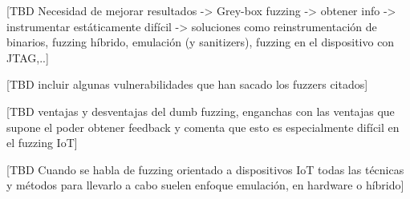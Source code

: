 [TBD Necesidad de mejorar resultados -> Grey-box fuzzing -> obtener info -> instrumentar estáticamente difícil -> soluciones como 
reinstrumentación de binarios, fuzzing híbrido, emulación (y sanitizers), fuzzing en el dispositivo con JTAG,..]

[TBD incluir algunas vulnerabilidades que han sacado los fuzzers citados]

[TBD ventajas y 
desventajas del dumb fuzzing, enganchas con las ventajas que supone el poder obtener feedback 
y comenta que esto es especialmente difícil en el fuzzing IoT]

[TBD Cuando se habla de fuzzing orientado a dispositivos IoT todas las técnicas y métodos para llevarlo 
a cabo suelen enfoque emulación, en hardware o híbrido]